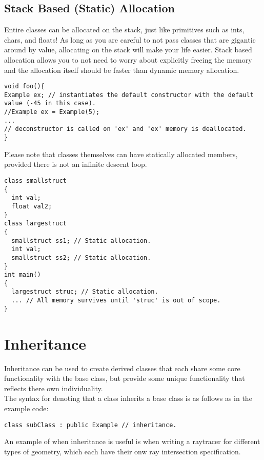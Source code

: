 \documentclass[12pt, letterpaper]{article}
\begin{document}
\subsection{Stack Based (Static) Allocation}

Entire classes can be allocated on the stack, just like primitives such as ints, chars, and floats! As long as you are careful to not pass classes that are gigantic around by value, allocating on the stack will make your life easier. Stack based allocation allows you to not need to worry about explicitly freeing the memory and the allocation itself should be faster than dynamic memory allocation.

\begin{verbatim}
void foo(){
Example ex; // instantiates the default constructor with the default value (-45 in this case).
//Example ex = Example(5);
...
// deconstructor is called on 'ex' and 'ex' memory is deallocated.
}
\end{verbatim}

Please note that classes themselves can have statically allocated members, provided there is not an infinite descent loop.
\begin{verbatim}
class smallstruct
{
  int val;
  float val2;
}
class largestruct
{
  smallstruct ss1; // Static allocation.
  int val;
  smallstruct ss2; // Static allocation.
}
int main()
{
  largestruct struc; // Static allocation.
  ... // All memory survives until 'struc' is out of scope.
}
\end{verbatim}

\newpage

\section{Inheritance}

Inheritance can be used to create derived classes that each share some core functionality with the base class, but provide some unique functionality that reflects there own individuality.\\

The syntax for denoting that a class inherits a base class is as follows as in the example code:

\begin{verbatim}
class subClass : public Example // inheritance.
\end{verbatim}

An example of when inheritance is useful is when writing a raytracer for different types of geometry, which each have their onw ray intersection specification.
\end{document}
